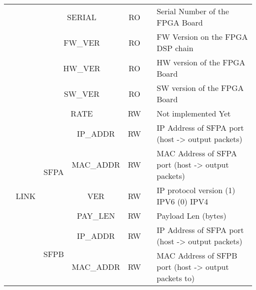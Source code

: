 \documentclass[11pt]{article}
\begin{document}
{\begin{landscape}
\begin{table}[H]
\begin{tabular}{|c|c|c|c|c|c|l|}
                       &                         & \multicolumn{2}{c|}{SERIAL}        & RO                &             & Serial Number of the FPGA Board                                       \\ \cline{3-7} 
                       &                         & \multicolumn{2}{c|}{FW\_VER}       & RO                &             & FW Version on the FPGA DSP chain                                      \\ \cline{3-7} 
                       &                         & \multicolumn{2}{c|}{HW\_VER}       & RO                &             & HW version of the FPGA Board                                          \\ \cline{3-7} 
                       &                         & \multicolumn{2}{c|}{SW\_VER}       & RO                &             & SW version of the FPGA Board                                          \\ \cline{2-7} 
                       & \multirow{12}{*}{LINK}  & \multicolumn{2}{c|}{RATE}          & RW                &             & Not implemented Yet                                                   \\ \cline{3-7} 
                       &                         & \multirow{4}{*}{SFPA}  & IP\_ADDR  & RW                &             & IP Address of SFPA port (host -> output packets)  \\ \cline{4-7} 
                       &                         &                        & MAC\_ADDR & RW                &             & MAC Address of SFPA port (host -> output packets) \\ \cline{4-7} 
                       &                         &                        & VER       & RW                &             & IP protocol version (1) IPV6 (0) IPV4                                 \\ \cline{4-7} 
                       &                         &                        & PAY\_LEN  & RW                &             & Payload Len (bytes)                                                   \\ \cline{3-7} 
                       &                         & \multirow{4}{*}{SFPB}  & IP\_ADDR  & RW                &             & IP Address of SFPA port (host -> output packets)  \\ \cline{4-7} 
                       &                         &                        & MAC\_ADDR & RW                &             & MAC Address of SFPB port (host -> output packets to) \\ \cline{4-7} 

\end{tabular}
\end{table}
\end{landscape}}
\end{document}
